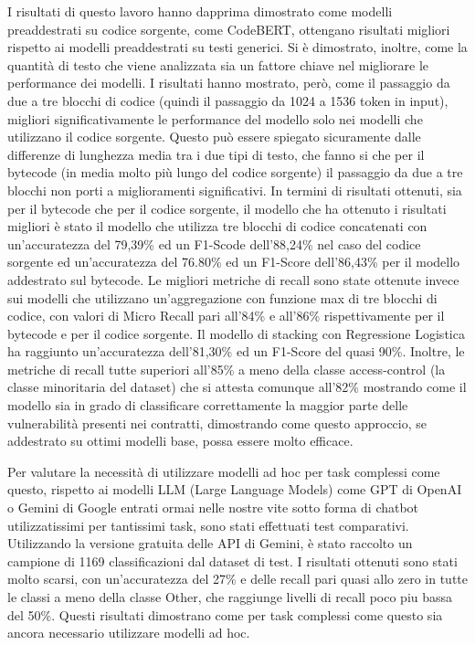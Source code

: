 \documentclass[../../Thesis.tex]{subfiles}
\begin{document}
I risultati di questo lavoro hanno dapprima dimostrato come modelli preaddestrati su codice sorgente, come CodeBERT, ottengano risultati migliori rispetto ai modelli preaddestrati su testi generici. Si \`e dimostrato, inoltre, come la quantit\`a di testo che viene analizzata sia un fattore chiave nel migliorare le performance dei modelli. I risultati hanno mostrato, per\`o, come il passaggio da due a tre blocchi di codice (quindi il passaggio da 1024 a 1536 token in input), migliori significativamente le performance del modello solo nei modelli che utilizzano il codice sorgente. Questo pu\`o essere spiegato sicuramente dalle differenze di lunghezza media tra i due tipi di testo, che fanno si che per il bytecode (in media molto pi\`u lungo del codice sorgente) il passaggio da due a tre blocchi non porti a miglioramenti significativi. 
In termini di risultati ottenuti, sia per il bytecode che per il codice sorgente, il modello che ha ottenuto i risultati migliori \`e stato il modello che utilizza tre blocchi di codice concatenati con un'accuratezza del 79,39\% ed un F1-Scode dell'88,24\% nel caso del codice sorgente ed un'accuratezza del 76.80\% ed un F1-Score dell'86,43\% per il modello addestrato sul bytecode. Le migliori metriche di recall sono state ottenute invece sui modelli che utilizzano  un'aggregazione con funzione max di tre blocchi di codice, con valori di Micro Recall pari all'84\% e all'86\% rispettivamente per il bytecode e per il codice sorgente.
Il modello di stacking con Regressione Logistica ha raggiunto un'accuratezza dell'81,30\% ed un F1-Score del quasi 90\%. Inoltre, le metriche di recall tutte superiori all'85\% a meno della classe access-control (la classe minoritaria del dataset) che si attesta comunque all'82\% mostrando come il modello sia in grado di classificare correttamente la maggior parte delle vulnerabilit\`a presenti nei contratti, dimostrando come questo approccio, se addestrato su ottimi modelli base, possa essere molto efficace.

Per valutare la necessit\`a di utilizzare modelli ad hoc per task complessi come questo, rispetto ai modelli LLM (Large Language Models) come GPT di OpenAI o Gemini di Google entrati ormai nelle nostre vite sotto forma di chatbot utilizzatissimi per tantissimi task, sono stati effettuati test comparativi. Utilizzando la versione gratuita delle API di Gemini, \`e stato raccolto un campione di 1169 classificazioni dal dataset di test. I risultati ottenuti sono stati molto scarsi, con un'accuratezza del 27\% e delle recall pari quasi allo zero in tutte le classi a meno della classe Other, che raggiunge livelli di recall poco piu bassa del 50\%. Questi risultati dimostrano come per task complessi come questo sia ancora necessario utilizzare modelli ad hoc.
\end{document}
